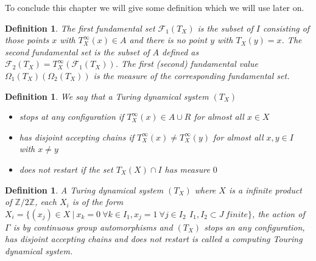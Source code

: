 \documentclass[12pt,a4paper]{scrartcl}
\newtheorem{Definition}[Theorem]{Definition}
\numberwithin{equation}{section}
\newcommand{\2}{\mathbb{Z} / 2 \mathbb{Z}}
\newcommand{\1}{\overline{1}}
\newcommand{\0}{\overline{0}}
\begin{document}
To conclude this chapter we will give some definition which we will use later on. 
\begin{Definition}
	The first fundamental set $\mathcal{F}_1(T_X)$ is the subset of $I$ consisting of those points $x$ with $T_X^\infty(x) \in A$ and there is no point $y$ with $T_X(y)=x$. The second fundamental set is the subset of $A$ defined as $\mathcal{F}_2(T_X)=T_X^\infty(\mathcal{F}_1(T_X))$. The first (second) fundamental value $\Omega_1(T_X) ( \Omega_2(T_X))$ is the measure of the corresponding fundamental set.
\end{Definition}

\begin{Definition}
	We say that a Turing dynamical system $(T_X)$
	\begin{itemize}
		\item stops at any configuration if $T_X^\infty (x) \in A \cup R$ for almost all $x \in X$
		\item has disjoint accepting chains if $T_X^\infty (x) \neq T_X^\infty (y)$ for almost all $x, y \in I$ with $x \neq y$
		\item does not restart if the set $T_X(X) \cap I$ has measure $0$
	\end{itemize}
\end{Definition}

\begin{Definition}
	A Turing dynamical system $(T_X)$ where $X$ is a infinite product of $\2$, each $X_i$ is of the form $X_i = \{(x_j) \in X \ | \ x_k = 0 \ \forall k \in I_1, x_j = 1 \ \forall j \in I_2\, \ I_1, I_2 \subset J \ finite\}$, the action of $\Gamma$ is by continuous group automorphisms and  $(T_X)$ stops an any configuration, has disjoint accepting chains and does not restart is called a computing Touring dynamical system.
\end{Definition}
\end{document}
